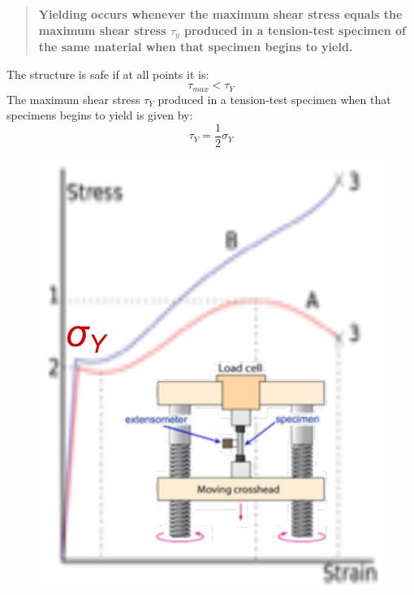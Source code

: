 \documentclass[class=report, crop=false, 12pt,a4paper]{standalone}
\begin{document}
\begin{quotation}
  \textbf{Yielding occurs whenever the maximum shear stress equals the maximum shear stress $\tau_y$ produced in a tension-test specimen of the same material when that specimen begins to yield.}
\end{quotation}
The structure is safe if at all points it is:
\begin{equation}
  \tau_{max} < \tau_Y
\end{equation}
The maximum shear stress $\tau_Y$ produced in a tension-test specimen when that specimens begins to yield is given by:
\begin{equation}
  \tau_Y = \frac{1}{2}\sigma_Y
\end{equation}
\begin{figure}
  \begin{center}
    \begin{minipage}[b]{0.46\textwidth}
      \centering
      \includegraphics[width = 0.8 \textwidth]{../img/diagram22.png}
      \caption{}
    \end{minipage}
    \begin{minipage}[b]{0.46\textwidth}
      \centering

\end{minipage}
\end{center}
\end{figure}
\end{document}
